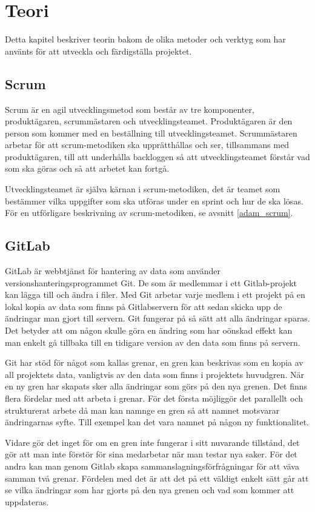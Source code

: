 \chapter{Teori}
Detta kapitel beskriver teorin bakom de olika metoder och verktyg som har använts för att utveckla och färdigställa projektet.

\section{Scrum} \label{scrum}
Scrum är en agil utvecklingsmetod som består av tre komponenter, produktägaren, scrummästaren och utvecklingsteamet.
Produktägaren är den person som kommer med en beställning till utvecklingsteamet.
Scrummästaren arbetar för att scrum-metodiken ska upprätthållas och ser, tillsammans med produktägaren, till att underhålla backloggen så att utvecklingsteamet förstår vad som ska göras och så att arbetet kan fortgå.

Utvecklingsteamet är själva kärnan i scrum-metodiken, det är teamet som bestämmer vilka uppgifter som ska utföras under en sprint och hur de ska lösas.
För en utförligare beskrivning av scrum-metodiken, se avsnitt \ref{adam_scrum}.

\section{GitLab}
GitLab är webbtjänst för hantering av data som använder versionshanteringsprogrammet Git. De som är medlemmar i ett Gitlab-projekt kan lägga till och ändra i filer.
Med Git arbetar varje medlem i ett projekt på en lokal kopia av data som finns på Gitlabservern för att sedan skicka upp de ändringar man gjort till servern. Git fungerar på så sätt att alla ändringar sparas. Det betyder att om någon skulle göra en ändring som har oönskad effekt kan man enkelt gå tillbaka till en tidigare version av den data som finns på servern.

Git har stöd för något som kallas grenar, en gren kan beskrivas som en kopia av all projektets data, vanligtvis av den data som finns i projektets huvudgren. När en ny gren har skapats sker alla ändringar som görs på den nya grenen. Det finns flera fördelar med att arbeta i grenar. För det första möjliggör det parallellt och strukturerat arbete då man kan namnge en gren så att namnet motsvarar ändringarnas syfte. Till exempel kan det vara namnet på någon ny funktionalitet.

Vidare gör det inget för om en gren inte fungerar i sitt nuvarande tillstånd, det gör att man inte förstör för sina medarbetar när man testar nya saker. För det andra kan man genom Gitlab skapa sammanslagningsförfrågningar för att väva samman två grenar. Fördelen med det är att det på ett väldigt enkelt sätt går att se vilka ändringar som har gjorts på den nya grenen och vad som kommer att uppdateras.

